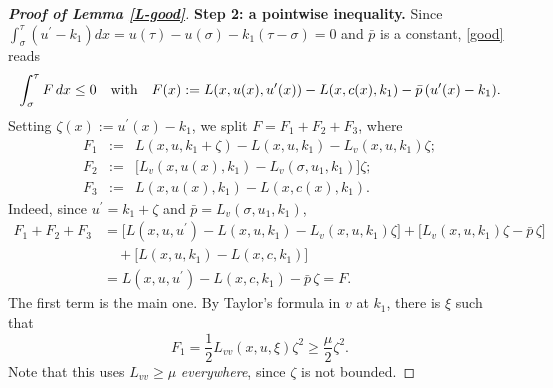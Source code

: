 \documentclass[reqno,12pt]{amsart}
\numberwithin{equation}{section}
\theoremstyle{remark}
\begin{document}
\begin{proof}[\bf Proof of Lemma \ref{L-good}]
{\bf Step 2: a pointwise inequality.} Since $\int_\sigma^\tau(u^\prime-k_1)dx=u(\tau)-u(\sigma)-k_1(\tau-\sigma)=0$ and $\bar p$ is a constant, \eqref{good} reads
\begin{equation*}
\int_\sigma^\tau F\,dx\leq0\quad\hbox{with}\quad F(x):=L(x,u(x),u^\prime(x))-L(x,c(x),k_1)-\bar p\,(u^\prime(x)-k_1).
\end{equation*}
Setting $\zeta(x):=u^\prime(x)-k_1$, we split $F=F_1+F_2+F_3$, where
\begin{eqnarray*}
F_1&:=&L(x,u,k_1+\zeta)-L(x,u,k_1)-L_v(x,u,k_1)\zeta;\\
F_2&:=&\big[L_v(x,u(x),k_1)-L_v(\sigma,u_1,k_1)\big]\zeta;\\
F_3&:=&L(x,u(x),k_1)-L(x,c(x),k_1).
\end{eqnarray*}
Indeed, since $u^\prime=k_1+\zeta$ and $\bar p=L_v(\sigma,u_1,k_1)$,
\begin{align*}
F_1+F_2+F_3&=\big[L(x,u,u^\prime)-L(x,u,k_1)-L_v(x,u,k_1)\zeta\big]+\big[L_v(x,u,k_1)\zeta-\bar p\,\zeta\big]\\
&\quad+\big[L(x,u,k_1)-L(x,c,k_1)\big]\\
&=L(x,u,u^\prime)-L(x,c,k_1)-\bar p\,\zeta=F.
\end{align*}
The first term is the main one. By Taylor's formula in $v$ at $k_1$, there is $\xi$ such that
\begin{equation*}
F_1=\frac12L_{vv}(x,u,\xi)\zeta^2\geq\frac\mu2\zeta^2.
\end{equation*}
Note that this uses $L_{vv}\geq\mu$ {\em everywhere}, since $\zeta$ is not bounded.

\smallskip


\end{proof}
\end{document}
